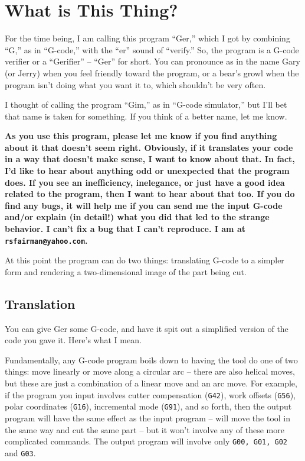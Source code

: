 \documentclass[titlepage,oneside,10pt]{article}
\begin{document}
\raggedbottom

\newcommand{\mymargin}[1]{\marginpar{\rm\tiny #1}}
\newcommand{\leftmar}[1]{\reversemarginpar \mymargin{#1}}

\newcommand{\ignoretext}[1]{}


\section{What is This Thing?}

For the time being, I am calling this program ``Ger,'' which I got by
combining ``G,'' as in ``G-code,'' with the ``er'' sound of
``verify.'' So, the program is a G-code verifier or a ``Gerifier'' --
``Ger'' for short. You can pronounce as in the name Gary (or Jerry)
when you feel friendly toward the program, or a bear's growl when the 
program isn't doing what you want it to, which shouldn't be very often.

I thought of calling the program ``Gim,'' as in ``G-code simulator,''
but I'll bet that name is taken for something. If you think of a better
name, let me know.

{\bf As you use this program, please let me know if you find anything
  about it that doesn't seem right. Obviously, if it translates your
  code in a way that doesn't make sense, I want to know about that. In
  fact, I'd like to hear about anything odd or unexpected that the
  program does. If you see an inefficiency, inelegance, or just have a
good idea related to the program, then I want to hear about that
too. If you do find any bugs, it will help me if you can
send me the input G-code and/or explain (in detail!) what you did that
led to the strange behavior. I can't fix a bug that I can't
reproduce. I am at {\tt rsfairman@yahoo.com}. }

At this point the program can do two things: translating G-code to a
simpler form and rendering a two-dimensional image of the part being
cut.

\subsection{Translation}

You can give Ger some G-code, and have it spit out a simplified
version of the code you gave it. Here's what I mean.

Fundamentally, any G-code program boils down to having the tool do one
of two things: move linearly or move along a circular arc -- there are
also helical moves, but these are just a combination of a linear move
and an arc move. For example, if the program you input involves cutter
compensation ({\tt G42}), work offsets ({\tt G56}), polar coordinates
({\tt G16}), incremental mode ({\tt G91}), and so forth, then the output
program will have the same effect as the input program -- will move
the tool in the same way and cut the same part -- but it won't involve
any of these more complicated commands. The output program will
involve only {\tt G00, G01, G02} and {\tt G03}.
\end{document}
